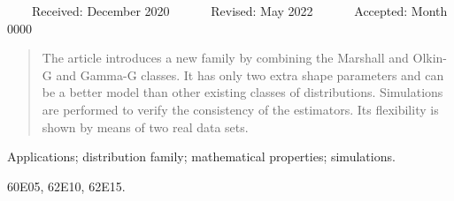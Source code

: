\documentclass[twoside,leqno,11pt]{article}
\begin{document}

\maketitle
\setpagewiselinenumbers
\modulolinenumbers[1]
\noindent
~~~~{\small{\sffamily Received:} December 2020 ~~~~~~{\sffamily Revised:} May 2022 ~~~~~~{\sffamily Accepted:} Month 0000}

\begin{abstract}
The article introduces a new family by combining the Marshall and Olkin-G and Gamma-G classes. It has only two
extra shape parameters and can be a better model than other existing classes of distributions. Simulations are performed to verify the consistency of the estimators. Its flexibility is shown by means of two real data sets.
\end{abstract}

\begin{keywords}
Applications; distribution family; mathematical properties; simulations. 
\end{keywords}

\begin{ams}
60E05, 62E10, 62E15.
\end{ams}
\end{document}

